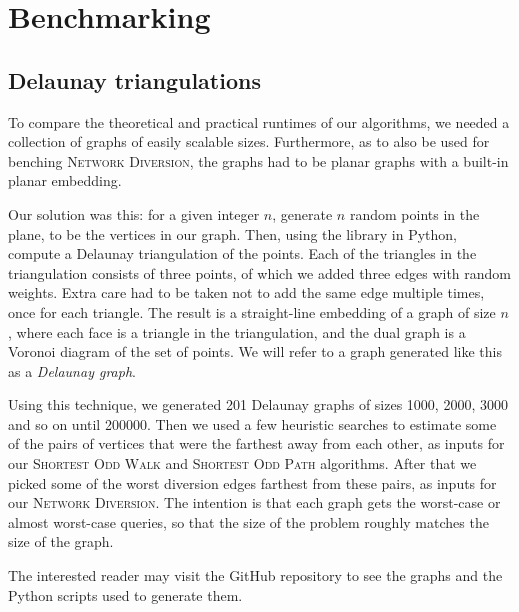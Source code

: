 \section{Benchmarking}


\subsection{Delaunay triangulations}
\label{subsection:delaunay}
To compare the theoretical and practical runtimes of our algorithms, we needed a collection of graphs of easily scalable sizes. Furthermore, as to also be used for benching \textsc{Network Diversion}, the graphs had to be planar graphs with a built-in planar embedding.

Our solution was this: for a given integer $n$, generate $n$ random points in the plane, to be the vertices in our graph. Then, using the  library in Python, compute a Delaunay triangulation of the points. Each of the triangles in the triangulation consists of three points, of which we added three edges with random weights. Extra care had to be taken not to add the same edge multiple times, once for each triangle. The result is a straight-line embedding of a graph of size $n$, where each face is a triangle in the triangulation, and the dual graph is a Voronoi diagram of the set of points. We will refer to a graph generated like this as a \emph{Delaunay graph}.

Using this technique, we generated 201 Delaunay graphs of sizes 1000, 2000, 3000 and so on until 200000. Then we used a few heuristic searches to estimate some of the pairs of vertices that were the farthest away from each other, as inputs for our \textsc{Shortest Odd Walk} and \textsc{Shortest Odd Path} algorithms. After that we picked some of the worst diversion edges farthest from these pairs, as inputs for our \textsc{Network Diversion}. The intention is that each graph gets the worst-case or almost worst-case queries, so that the size of the problem roughly matches the size of the graph.

The interested reader may visit the GitHub repository \cite{source:codebase} to see the graphs and the Python scripts used to generate them.

